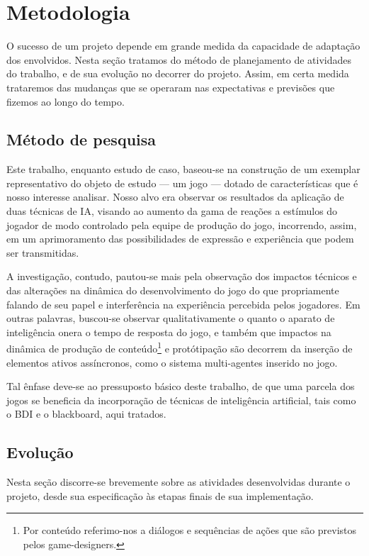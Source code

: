 \chapter{Metodologia}

O sucesso de um projeto depende em grande medida da capacidade de
adaptação dos envolvidos. Nesta seção tratamos do método de
planejamento de atividades do trabalho, e de sua evolução no decorrer
do projeto. Assim, em certa medida trataremos das mudanças que se
operaram nas expectativas e previsões que fizemos ao longo do tempo.

\section{Método de pesquisa}

Este trabalho, enquanto estudo de caso, baseou-se na construção de um
exemplar representativo do objeto de estudo --- um jogo --- dotado de
características que é nosso interesse analisar. Nosso alvo era
observar os resultados da aplicação de duas técnicas de IA, visando ao
aumento da gama de reações a estímulos do jogador de modo controlado
pela equipe de produção do jogo, incorrendo, assim, em um aprimoramento
das possibilidades de expressão e experiência que podem ser
transmitidas.

A investigação, contudo, pautou-se mais pela observação dos impactos
técnicos e das alterações na dinâmica do desenvolvimento do jogo do
que propriamente falando de seu papel e interferência na experiência
percebida pelos jogadores. Em outras palavras, buscou-se observar
qualitativamente o quanto o aparato de inteligência onera o tempo de
resposta do jogo, e também que impactos na dinâmica de produção de
conteúdo\footnote{Por conteúdo   referimo-nos a diálogos e sequências
  de ações que são previstos   pelos game-designers.} e protótipação
são decorrem da inserção de elementos ativos assíncronos, como o
sistema multi-agentes inserido no jogo.

Tal ênfase deve-se ao pressuposto básico deste trabalho, de que uma
parcela dos jogos se beneficia da incorporação de técnicas de
inteligência artificial, tais como o BDI e o blackboard, aqui tratados.


\section{Evolução}

Nesta seção discorre-se brevemente sobre as atividades desenvolvidas durante o projeto, desde sua especificação às etapas finais de sua implementação.

